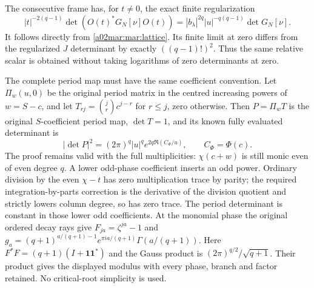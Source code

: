 The consecutive frame has, for $t\ne0$, the exact finite
regularization
\begin{equation}\tag{MAR30}\label{a02mar:mar:singulargram}
 |t|^{-2(q-1)}\det(O(t)^*G_N[\nu]O(t))
      =|b_\lambda|^{2q}|u|^{-q(q-1)}\det G_N[\nu].
\end{equation}
It follows directly from \eqref{a02mar:mar:lattice}. Its finite limit
at zero differs from the regularized $J$ determinant by
exactly $((q-1)!)^2$. Thus the same relative scalar is obtained
without taking logarithms of zero determinants at zero.

The complete period map must have the same coefficient convention.
Let $\Pi_w(u,0)$ be the original period matrix in the centred
increasing powers of $w=S-c$, and let
$T_{rj}=\binom jr c^{j-r}$ for $r\le j$, zero otherwise.
Then $P=\Pi_w T$ is the original $S$-coefficient period map,
$\det T=1$, and its known fully evaluated determinant is
\[
 |\det P|^2=(2\pi)^q|u|^q e^{2q\Re(C_\Phi/u)},\qquad
 C_\Phi=\Phi(c).
\]
The proof remains valid with the full multiplicities: $\chi(c+w)$
is still monic even of even degree $q$. A lower odd-phase
coefficient inserts an odd power. Ordinary division by the even
$\chi-t$ has zero multiplication trace by parity; the required
integration-by-parts correction is the derivative of the division
quotient and strictly lowers column degree, so has zero trace.
The period determinant is constant in those lower odd
coefficients. At the monomial phase the original ordered decay
rays give $F_{ja}=\zeta^{ja}-1$ and
$g_a=(q+1)^{a/(q+1)-1}e^{\pi ia/(q+1)}\Gamma(a/(q+1))$.
Here $F^*F=(q+1)(I+\mathbf1\mathbf1^*)$ and the Gauss product
\cite{a02mar:dlmf} is $(2\pi)^{q/2}/\sqrt{q+1}$. Their product gives
the displayed modulus with every phase, branch and factor
retained. No critical-root simplicity is used.

